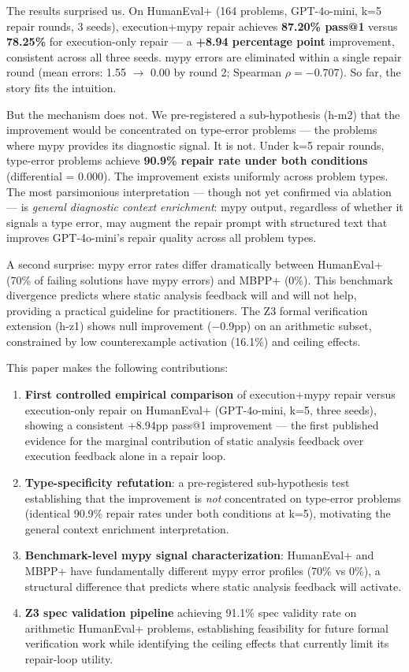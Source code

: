 The results surprised us. On HumanEval+ (164 problems, GPT-4o-mini, k=5
repair rounds, 3 seeds), execution+mypy repair achieves \textbf{87.20\% pass@1}
versus \textbf{78.25\%} for execution-only repair --- a \textbf{+8.94 percentage
point} improvement, consistent across all three seeds. mypy errors are eliminated
within a single repair round (mean errors: 1.55 $\to$ 0.00 by round 2;
Spearman $\rho = -0.707$). So far, the story fits the intuition.

But the mechanism does not. We pre-registered a sub-hypothesis (h-m2) that
the improvement would be concentrated on type-error problems --- the problems
where mypy provides its diagnostic signal. It is not. Under k=5 repair rounds,
type-error problems achieve \textbf{90.9\% repair rate under both conditions}
(differential = 0.000). The improvement exists uniformly across problem types.
The most parsimonious interpretation --- though not yet confirmed via ablation ---
is \emph{general diagnostic context enrichment}: mypy output, regardless of
whether it signals a type error, may augment the repair prompt with structured
text that improves GPT-4o-mini's repair quality across all problem types.

A second surprise: mypy error rates differ dramatically between HumanEval+
(70\% of failing solutions have mypy errors) and MBPP+ (0\%). This benchmark
divergence predicts where static analysis feedback will and will not help,
providing a practical guideline for practitioners. The Z3 formal verification
extension (h-z1) shows null improvement ($-$0.9pp) on an arithmetic subset,
constrained by low counterexample activation (16.1\%) and ceiling effects.

This paper makes the following contributions:

\begin{enumerate}
\item \textbf{First controlled empirical comparison} of execution+mypy repair
versus execution-only repair on HumanEval+ (GPT-4o-mini, k=5, three seeds),
showing a consistent +8.94pp pass@1 improvement --- the first published evidence
for the marginal contribution of static analysis feedback over execution feedback
alone in a repair loop.

\item \textbf{Type-specificity refutation}: a pre-registered sub-hypothesis test
establishing that the improvement is \emph{not} concentrated on type-error
problems (identical 90.9\% repair rates under both conditions at k=5),
motivating the general context enrichment interpretation.

\item \textbf{Benchmark-level mypy signal characterization}: HumanEval+ and
MBPP+ have fundamentally different mypy error profiles (70\% vs 0\%), a
structural difference that predicts where static analysis feedback will activate.

\item \textbf{Z3 spec validation pipeline} achieving 91.1\% spec validity rate
on arithmetic HumanEval+ problems, establishing feasibility for future formal
verification work while identifying the ceiling effects that currently limit
its repair-loop utility.
\end{enumerate}

